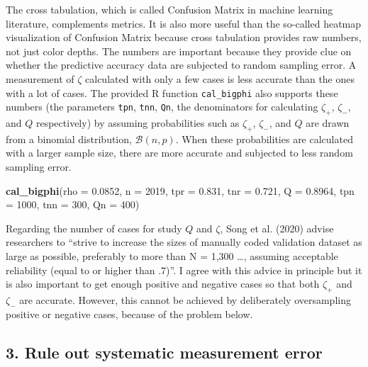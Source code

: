 \documentclass[english,man,floatsintext]{apa6}
\newenvironment{Shaded}{\begin{snugshade}}{\end{snugshade}}
\newcommand{\DataTypeTok}[1]{\textcolor[rgb]{0.13,0.29,0.53}{#1}}
\newcommand{\DecValTok}[1]{\textcolor[rgb]{0.00,0.00,0.81}{#1}}
\newcommand{\FloatTok}[1]{\textcolor[rgb]{0.00,0.00,0.81}{#1}}
\newcommand{\KeywordTok}[1]{\textcolor[rgb]{0.13,0.29,0.53}{\textbf{#1}}}
\newcommand{\NormalTok}[1]{#1}
\begin{document}
The cross tabulation, which is called Confusion Matrix in machine learning literature, complements metrics. It is also more useful than the so-called heatmap visualization of Confusion Matrix because cross tabulation provides raw numbers, not just color depths. The numbers are important because they provide clue on whether the predictive accuracy data are subjected to random sampling error. A measurement of \(\zeta\) calculated with only a few cases is less accurate than the ones with a lot of cases. The provided R function \texttt{cal\_bigphi} also supports these numbers (the parameters \texttt{tpn}, \texttt{tnn}, \texttt{Qn}, the denominators for calculating \(\zeta_{+}\), \(\zeta_{-}\), and \(Q\) respectively) by assuming probabilities such as \(\zeta_{+}\), \(\zeta_{-}\), and \(Q\) are drawn from a binomial distribution, \(\mathcal{B}(n, p)\). When these probabilities are calculated with a larger sample size, there are more accurate and subjected to less random sampling error.

\begin{Shaded}
\begin{Highlighting}[]
\KeywordTok{cal_bigphi}\NormalTok{(}\DataTypeTok{rho =} \FloatTok{0.0852}\NormalTok{, }\DataTypeTok{n =} \DecValTok{2019}\NormalTok{,}
           \DataTypeTok{tpr =} \FloatTok{0.831}\NormalTok{, }\DataTypeTok{tnr =} \FloatTok{0.721}\NormalTok{,}
           \DataTypeTok{Q =} \FloatTok{0.8964}\NormalTok{, }\DataTypeTok{tpn =} \DecValTok{1000}\NormalTok{,}
           \DataTypeTok{tnn =} \DecValTok{300}\NormalTok{, }\DataTypeTok{Qn =} \DecValTok{400}\NormalTok{)}
\end{Highlighting}
\end{Shaded}

Regarding the number of cases for study \(Q\) and \(\zeta\), Song et al. (2020) advise researchers to \enquote{strive to increase the sizes of manually coded validation dataset as large as possible, preferably to more than N = 1,300 \ldots{}, assuming acceptable reliability (equal to or higher than .7)}. I agree with this advice in principle but it is also important to get enough positive and negative cases so that both \(\zeta_{+}\) and \(\zeta_{-}\) are accurate. However, this cannot be achieved by deliberately oversampling positive or negative cases, because of the problem below.

\hypertarget{rule-out-systematic-measurement-error}{%
\subsection{3. Rule out systematic measurement error}\label{rule-out-systematic-measurement-error}}
\end{document}
